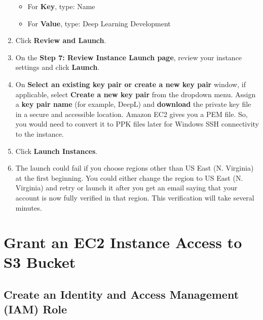 \documentclass[]{book}
\providecommand{\tightlist}{%
  \setlength{\itemsep}{0pt}\setlength{\parskip}{0pt}}
\begin{document}
\begin{enumerate}
  \begin{itemize}
  \tightlist
  \item
    For \textbf{Key}, type: Name
  \item
    For \textbf{Value}, type: Deep Learning Development
  \end{itemize}
\item
  Click \textbf{Review and Launch}.
\item
  On the \textbf{Step 7: Review Instance Launch page}, review your instance settings and click \textbf{Launch}.
\item
  On \textbf{Select an existing key pair or create a new key pair} window, if applicable, select \textbf{Create a new key pair} from the dropdown menu. Assign a \textbf{key pair name} (for example, DeepL) and \textbf{download} the private key file in a secure and accessible location. Amazon EC2 gives you a PEM file. So, you would need to convert it to PPK files later for Windows SSH connectivity to the instance.\\
\item
  Click \textbf{Launch Instances}.
\item
  The launch could fail if you choose regions other than US East (N. Virginia) at the first beginning. You could either change the region to US East (N. Virginia) and retry or launch it after you get an email saying that your account is now fully verified in that region. This verification will take several minutes.
\end{enumerate}

\hypertarget{grant-an-ec2-instance-access-to-s3-bucket}{%
\chapter{Grant an EC2 Instance Access to S3 Bucket}\label{grant-an-ec2-instance-access-to-s3-bucket}}

\hypertarget{create-an-identity-and-access-management-iam-role}{%
\section{Create an Identity and Access Management (IAM) Role}\label{create-an-identity-and-access-management-iam-role}}
\end{document}
